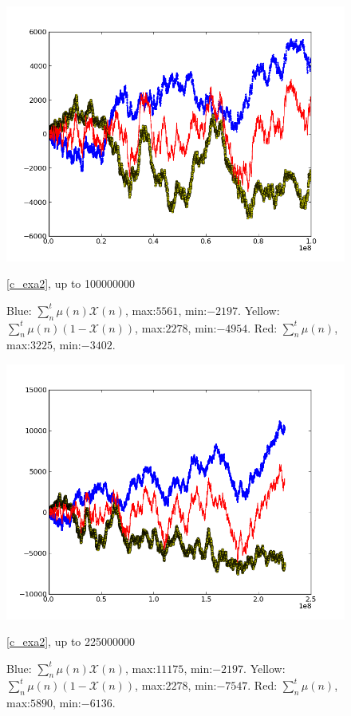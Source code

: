 \documentclass[a4paper,10pt]{amsart}
\begin{document}
\begin{figure}[h]
    \includegraphics[scale=0.5]{100000000_all.png}
    \caption{\cref{c_exa2}, up to 100000000}
    \caption*{Blue: $\sum^{t}_{n} \mu(n)\mathcal{X}(n)$, max:$5561$, min:$
        -2197$.
        Yellow: $\sum^{t}_{n} \mu(n)(1-\mathcal{X}(n))$, max:$2278$, min:$
        -4954$. 
        Red: $\sum^{t}_{n} \mu(n)$, max:$3225$, min:$-3402$.}
\end{figure}

\begin{figure}[h]
    \includegraphics[scale=0.5]{225000000_all.png}
    \caption{\cref{c_exa2}, up to 225000000}
    \caption*{Blue: $\sum^{t}_{n} \mu(n)\mathcal{X}(n)$, max:$11175$, min:$
        -2197$.
        Yellow: $\sum^{t}_{n} \mu(n)(1-\mathcal{X}(n))$, max:$2278$, min:$
        -7547$. 
        Red: $\sum^{t}_{n} \mu(n)$, max:$5890$, min:$-6136$.}
\end{figure}
\end{document}
